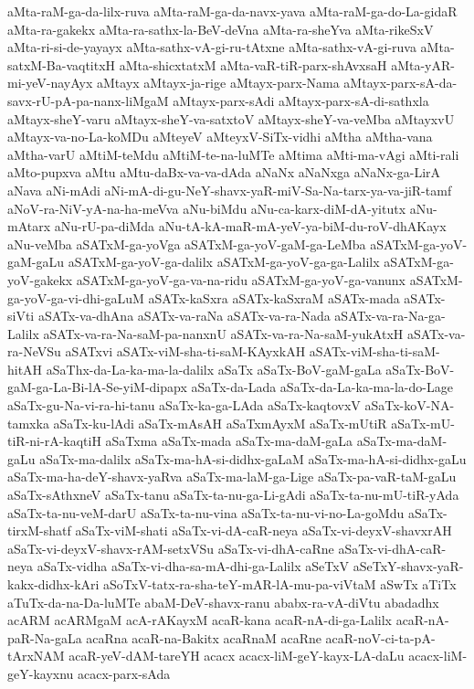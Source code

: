 {aMta-raM-ga-da-lilx-ruva
aMta-raM-ga-da-navx-yava
aMta-raM-ga-do-La-gidaR
aMta-ra-gakekx
aMta-ra-sathx-la-BeV-deVna
aMta-ra-sheYva
aMta-rikeSxV
aMta-ri-si-de-yayayx
aMta-sathx-vA-gi-ru-tAtxne
aMta-sathx-vA-gi-ruva
aMta-satxM-Ba-vaqtitxH
aMta-shicxtatxM
aMta-vaR-tiR-parx-shAvxsaH
aMta-yAR-mi-yeV-nayAyx
aMtayx
aMtayx-ja-rige
aMtayx-parx-Nama
aMtayx-parx-sA-da-savx-rU-pA-pa-nanx-liMgaM
aMtayx-parx-sAdi
aMtayx-parx-sA-di-sathxla
aMtayx-sheY-varu
aMtayx-sheY-va-satxtoV
aMtayx-sheY-va-veMba
aMtayxvU
aMtayx-va-no-La-koMDu
aMteyeV
aMteyxV-SiTx-vidhi
aMtha
aMtha-vana
aMtha-varU
aMtiM-teMdu
aMtiM-te-na-luMTe
aMtima
aMti-ma-vAgi
aMti-rali
aMto-pupxva
aMtu
aMtu-daBx-va-va-dAda
aNaNx
aNaNxga
aNaNx-ga-LirA
aNava
aNi-mAdi
aNi-mA-di-gu-NeY-shavx-yaR-miV-Sa-Na-tarx-ya-va-jiR-tamf
aNoV-ra-NiV-yA-na-ha-meVva
aNu-biMdu
aNu-ca-karx-diM-dA-yitutx
aNu-mAtarx
aNu-rU-pa-diMda
aNu-tA-kA-maR-mA-yeV-ya-biM-du-roV-dhAKayx
aNu-veMba
aSATxM-ga-yoVga
aSATxM-ga-yoV-gaM-ga-LeMba
aSATxM-ga-yoV-gaM-gaLu
aSATxM-ga-yoV-ga-dalilx
aSATxM-ga-yoV-ga-ga-Lalilx
aSATxM-ga-yoV-gakekx
aSATxM-ga-yoV-ga-va-na-ridu
aSATxM-ga-yoV-ga-vanunx
aSATxM-ga-yoV-ga-vi-dhi-gaLuM
aSATx-kaSxra
aSATx-kaSxraM
aSATx-mada
aSATx-siVti
aSATx-va-dhAna
aSATx-va-raNa
aSATx-va-ra-Nada
aSATx-va-ra-Na-ga-Lalilx
aSATx-va-ra-Na-saM-pa-nanxnU
aSATx-va-ra-Na-saM-yukAtxH
aSATx-va-ra-NeVSu
aSATxvi
aSATx-viM-sha-ti-saM-KAyxkAH
aSATx-viM-sha-ti-saM-hitAH
aSaThx-da-La-ka-ma-la-dalilx
aSaTx
aSaTx-BoV-gaM-gaLa
aSaTx-BoV-gaM-ga-La-Bi-lA-Se-yiM-dipapx
aSaTx-da-Lada
aSaTx-da-La-ka-ma-la-do-Lage
aSaTx-gu-Na-vi-ra-hi-tanu
aSaTx-ka-ga-LAda
aSaTx-kaqtovxV
aSaTx-koV-NA-tamxka
aSaTx-ku-lAdi
aSaTx-mAsAH
aSaTxmAyxM
aSaTx-mUtiR
aSaTx-mU-tiR-ni-rA-kaqtiH
aSaTxma
aSaTx-mada
aSaTx-ma-daM-gaLa
aSaTx-ma-daM-gaLu
aSaTx-ma-dalilx
aSaTx-ma-hA-si-didhx-gaLaM
aSaTx-ma-hA-si-didhx-gaLu
aSaTx-ma-ha-deY-shavx-yaRva
aSaTx-ma-laM-ga-Lige
aSaTx-pa-vaR-taM-gaLu
aSaTx-sAthxneV
aSaTx-tanu
aSaTx-ta-nu-ga-Li-gAdi
aSaTx-ta-nu-mU-tiR-yAda
aSaTx-ta-nu-veM-darU
aSaTx-ta-nu-vina
aSaTx-ta-nu-vi-no-La-goMdu
aSaTx-tirxM-shatf
aSaTx-viM-shati
aSaTx-vi-dA-caR-neya
aSaTx-vi-deyxV-shavxrAH
aSaTx-vi-deyxV-shavx-rAM-setxVSu
aSaTx-vi-dhA-caRne
aSaTx-vi-dhA-caR-neya
aSaTx-vidha
aSaTx-vi-dha-sa-mA-dhi-ga-Lalilx
aSeTxV
aSeTxY-shavx-yaR-kakx-didhx-kAri
aSoTxV-tatx-ra-sha-teY-mAR-lA-mu-pa-viVtaM
aSwTx
aTiTx
aTuTx-da-na-Da-luMTe
abaM-DeV-shavx-ranu
ababx-ra-vA-diVtu
abadadhx
acARM
acARMgaM
acA-rAKayxM
acaR-kana
acaR-nA-di-ga-Lalilx
acaR-nA-paR-Na-gaLa
acaRna
acaR-na-Bakitx
acaRnaM
acaRne
acaR-noV-ci-ta-pA-tArxNAM
acaR-yeV-dAM-tareYH
acacx
acacx-liM-geY-kayx-LA-daLu
acacx-liM-geY-kayxnu
acacx-parx-sAda
}

